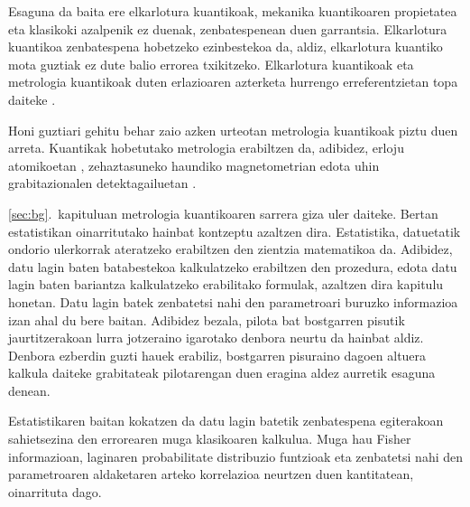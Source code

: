 Esaguna da baita ere elkarlotura kuantikoak, mekanika kuantikoaren propietatea eta klasikoki azalpenik ez duenak, zenbatespenean duen garrantsia.
Elkarlotura kuantikoa zenbatespena hobetzeko ezinbestekoa da, aldiz, elkarlotura kuantiko mota guztiak ez dute balio errorea txikitzeko.
Elkarlotura kuantikoak eta metrologia kuantikoak duten erlazioaren azterketa hurrengo erreferentzietan topa daiteke \cite{Pezze2009, Louchet-Chauvet2010, Appel2009, Riedel2010, Gross2010, Luecke2011, Strobel2014, Hyllus2010}.

Honi guztiari gehitu behar zaio azken urteotan metrologia kuantikoak piztu duen arreta.
Kuantikak hobetutako metrologia erabiltzen da, adibidez, erloju atomikoetan \cite{Louchet-Chauvet2010, Borregaard2013, Kessler2014a}, zehaztasuneko haundiko magnetometrian \cite{Wasilewski2010, Eckert2006, Wildermuth2006, Wolfgramm2010, Koschorreck2011, Vengalattore2007, Zhou2010} edota uhin grabitazionalen detektagailuetan \cite{Schnabel2010, TheLIGOScientificCollaboration2011, Demkowicz-Dobrzanski2013}.

\ref{sec:bg}.~kapituluan metrologia kuantikoaren sarrera giza uler daiteke.
Bertan estatistikan oinarritutako hainbat kontzeptu azaltzen dira.
Estatistika, datuetatik ondorio ulerkorrak ateratzeko erabiltzen den zientzia matematikoa da.
Adibidez, datu lagin baten batabestekoa kalkulatzeko erabiltzen den prozedura,
edota datu lagin baten bariantza kalkulatzeko erabilitako formulak, azaltzen dira kapitulu honetan.
Datu lagin batek zenbatetsi nahi den parametroari buruzko informazioa izan ahal du bere baitan.
Adibidez bezala, pilota bat bostgarren pisutik jaurtitzerakoan lurra jotzeraino igarotako denbora neurtu da hainbat aldiz.
Denbora ezberdin guzti hauek erabiliz, bostgarren pisuraino dagoen altuera kalkula daiteke grabitateak pilotarengan duen eragina aldez aurretik esaguna denean.

Estatistikaren baitan kokatzen da datu lagin batetik zenbatespena egiterakoan sahietsezina den errorearen muga klasikoaren kalkulua.
Muga hau Fisher informazioan, laginaren probabilitate distribuzio funtzioak eta zenbatetsi nahi den parametroaren aldaketaren arteko korrelazioa neurtzen duen kantitatean, oinarrituta dago.

